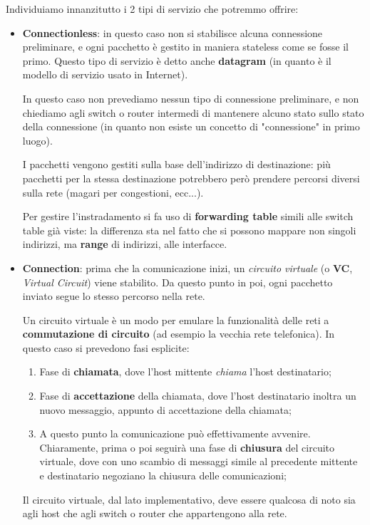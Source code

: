 \documentclass[a4paper,11pt]{article}
\begin{document}
Individuiamo innanzitutto i 2 tipi di servizio che potremmo offrire:
\begin{itemize}
	\item \textbf{Connectionless}: in questo caso non si stabilisce alcuna connessione preliminare, e ogni pacchetto è gestito in maniera stateless come se fosse il primo. Questo tipo di servizio è detto anche \textbf{datagram} (in quanto è il modello di servizio usato in Internet).

		In questo caso non prevediamo nessun tipo di connessione preliminare, e non chiediamo agli switch o router intermedi di mantenere alcuno stato sullo stato della connessione (in quanto non esiste un concetto di "connessione" in primo luogo).

		I pacchetti vengono gestiti sulla base dell'indirizzo di destinazione: più pacchetti per la stessa destinazione potrebbero però prendere percorsi diversi sulla rete (magari per congestioni, ecc...).

		Per gestire l'instradamento si fa uso di \textbf{forwarding table} simili alle switch table già viste: la differenza sta nel fatto che si possono mappare non singoli indirizzi, ma \textbf{range} di indirizzi, alle interfacce.

	\item \textbf{Connection}: prima che la comunicazione inizi, un \textit{circuito virtuale} (o \textbf{VC}, \textit{Virtual Circuit}) viene stabilito. Da questo punto in poi, ogni pacchetto inviato segue lo stesso percorso nella rete.

		Un circuito virtuale è un modo per emulare la funzionalità delle reti a \textbf{commutazione di circuito} (ad esempio la vecchia rete telefonica). In questo caso si prevedono fasi esplicite:
		\begin{enumerate}
			\item Fase di \textbf{chiamata}, dove l'host mittente \textit{chiama} l'host destinatario;
			\item Fase di \textbf{accettazione} della chiamata, dove l'host destinatario inoltra un nuovo messaggio, appunto di accettazione della chiamata;
			\item A questo punto la comunicazione può effettivamente avvenire. Chiaramente, prima o poi seguirà una fase di \textbf{chiusura} del circuito virtuale, dove con uno scambio di messaggi simile al precedente mittente e destinatario negoziano la chiusura delle comunicazioni;
		\end{enumerate}

		Il circuito virtuale, dal lato implementativo, deve essere qualcosa di noto sia agli host che agli switch o router che appartengono alla rete.


\end{itemize}
\end{document}
